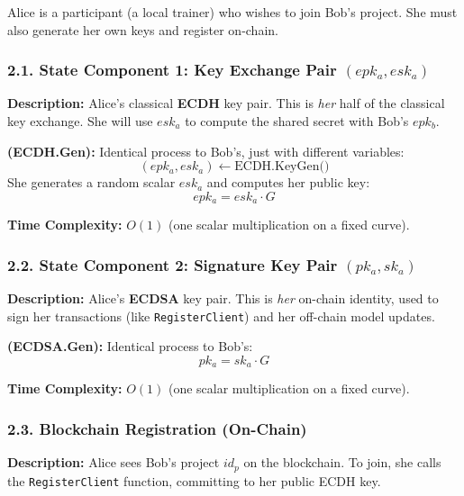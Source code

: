 \documentclass[12pt]{article}
\begin{document}
Alice is a participant (a local trainer) who wishes to join Bob's project. She must also generate her own keys and register on-chain.

\subsubsection*{2.1. State Component 1: Key Exchange Pair $(epk_a, esk_a)$}

\textbf{Description:}
Alice's classical \textbf{ECDH} key pair. This is \textit{her} half of the classical key exchange. She will use $esk_a$ to compute the shared secret with Bob's $epk_b$.

\textbf{ (ECDH.Gen):}
Identical process to Bob's, just with different variables:
\[
(epk_a, esk_a) \leftarrow \text{ECDH.KeyGen()}
\]
She generates a random scalar $esk_a$ and computes her public key:
\[
epk_a = esk_a \cdot G
\]

\textbf{Time Complexity:}
\textbf{$O(1)$} (one scalar multiplication on a fixed curve).

\subsubsection*{2.2. State Component 2: Signature Key Pair $(pk_a, sk_a)$}

\textbf{Description:}
Alice's \textbf{ECDSA} key pair. This is \textit{her} on-chain identity, used to sign her transactions (like \texttt{RegisterClient}) and her off-chain model updates.

\textbf{ (ECDSA.Gen):}
Identical process to Bob's:
\[
pk_a = sk_a \cdot G
\]

\textbf{Time Complexity:}
\textbf{$O(1)$} (one scalar multiplication on a fixed curve).

\subsubsection*{2.3. Blockchain Registration (On-Chain)}

\textbf{Description:}
Alice sees Bob's project $id_p$ on the blockchain. To join, she calls the \texttt{RegisterClient} function, committing to her public ECDH key.
\end{document}
